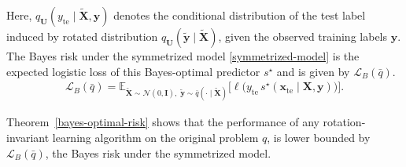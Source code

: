 \documentclass{article}
\theoremstyle{plain}
\theoremstyle{definition}
\theoremstyle{remark}
\begin{document}
Here, $q_{\mathbf{U}}(y_{\mathrm{te}} \mid \tilde{\boldsymbol X}, \boldsymbol y)$ denotes the conditional distribution of the test label induced by rotated distribution $ q_{\mathbf{U}}(\tilde{\boldsymbol y} \mid \tilde{\boldsymbol X})$, given the observed training labels $\boldsymbol{y}$.
The Bayes risk under the symmetrized model \eqref{symmetrized-model} is the expected logistic loss of this Bayes-optimal predictor $ s^\star$ and is given by $\mathcal{L}_B(\bar q)$. 
\begin{align*}
\mathcal{L}_B(\bar q)
=
\mathbb E_{\tilde{\boldsymbol X}\sim \mathcal N(0,\mathbf I),\;
\tilde{\boldsymbol y}\sim \bar q(\cdot\mid \tilde{\boldsymbol X})}
\Big[
\ell\!\big(
y_{\mathrm{te}}\,
s^\star(\boldsymbol x_{\mathrm{te}}\mid \boldsymbol X,\boldsymbol y)
\big)
\Big].
\end{align*}

Theorem~\ref{bayes-optimal-risk} shows that the performance of any rotation-invariant learning algorithm on the original problem $q$, is lower bounded by $\mathcal{L}_B(\bar q)$, the Bayes risk under the symmetrized model. 
\end{document}
